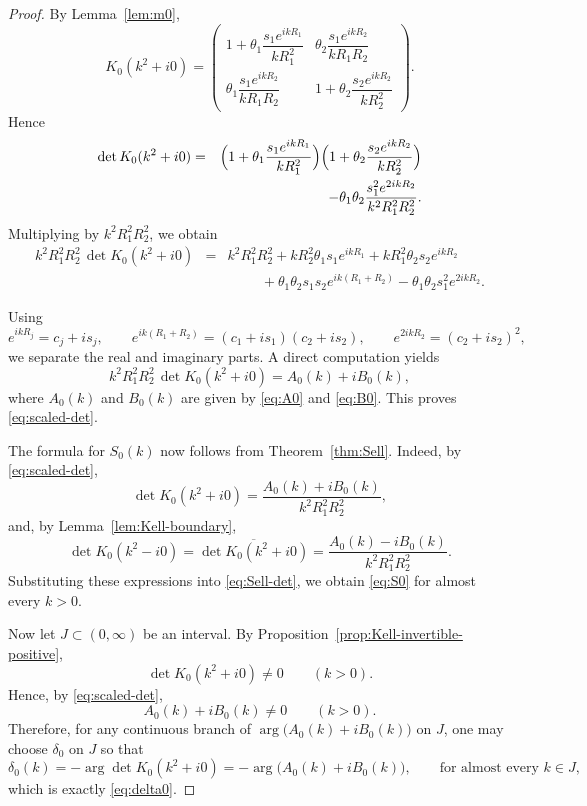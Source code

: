 \documentclass[a4paper,11pt]{article}
\numberwithin{equation}{section}
\theoremstyle{definition}
\theoremstyle{remark}
\begin{document}
\begin{proof}
By Lemma~\ref{lem:m0},
$$
K_0(k^2+i0)
=
\left(
\begin{array}{cc}
1+\theta_1\dfrac{s_1e^{ikR_1}}{kR_1^2} &
\theta_2\dfrac{s_1e^{ikR_2}}{kR_1R_2}
\\[12pt]
\theta_1\dfrac{s_1e^{ikR_2}}{kR_1R_2} &
1+\theta_2\dfrac{s_2e^{ikR_2}}{kR_2^2}
\end{array}
\right).
$$
Hence
\begin{eqnarray}
\det K_0(k^2+i0)
&=&
\Bigl(1+\theta_1\dfrac{s_1e^{ikR_1}}{kR_1^2}\Bigr)
\Bigl(1+\theta_2\dfrac{s_2e^{ikR_2}}{kR_2^2}\Bigr)
\nonumber\\
&&\hspace{1cm}
-
\theta_1\theta_2
\dfrac{s_1^2e^{2ikR_2}}{k^2R_1^2R_2^2}.
\label{eq:detK0-step1}
\end{eqnarray}
Multiplying by $k^2R_1^2R_2^2$, we obtain
\begin{eqnarray}
k^2R_1^2R_2^2\,\det K_0(k^2+i0)
&=&
k^2R_1^2R_2^2
+
kR_2^2\theta_1 s_1e^{ikR_1}
+
kR_1^2\theta_2 s_2e^{ikR_2}
\nonumber\\
&&\hspace{1cm}
+
\theta_1\theta_2 s_1s_2e^{ik(R_1+R_2)}
-
\theta_1\theta_2 s_1^2e^{2ikR_2}.
\label{eq:detK0-step2}
\end{eqnarray}

Using
$$
e^{ikR_j}=c_j+is_j,
\qquad
e^{ik(R_1+R_2)}=(c_1+is_1)(c_2+is_2),
\qquad
e^{2ikR_2}=(c_2+is_2)^2,
$$
we separate the real and imaginary parts. 
A direct computation yields
\begin{equation}\label{eq:detK0-step3}
k^2R_1^2R_2^2\,\det K_0(k^2+i0)=A_0(k)+iB_0(k),
\end{equation}
where $A_0(k)$ and $B_0(k)$ are given by \eqref{eq:A0} and \eqref{eq:B0}.
This proves \eqref{eq:scaled-det}.

The formula for $S_0(k)$ now follows from Theorem~\ref{thm:Sell}. Indeed,
by \eqref{eq:scaled-det},
$$
\det K_0(k^2+i0)=\frac{A_0(k)+iB_0(k)}{k^2R_1^2R_2^2},
$$
and, by Lemma~\ref{lem:Kell-boundary},
\[
\det K_0(k^2-i0)
=
\overline{\det K_0(k^2+i0)}
=
\frac{A_0(k)-iB_0(k)}{k^2R_1^2R_2^2}.
\]
Substituting these expressions into \eqref{eq:Sell-det}, we obtain
\eqref{eq:S0} for almost every $k>0$.

Now let $J\subset(0,\infty)$ be an interval.
By Proposition~\ref{prop:Kell-invertible-positive},
\[
\det K_0(k^2+i0)\neq0
\qquad (k>0).
\]
Hence, by \eqref{eq:scaled-det},
\[
A_0(k)+iB_0(k)\neq0
\qquad (k>0).
\]
Therefore, for any continuous branch of
$\arg\bigl(A_0(k)+iB_0(k)\bigr)$ on $J$, one may choose $\delta_0$ on $J$ so
that
\[
\delta_0(k)
=
-\arg\det K_0(k^2+i0)
=
-\arg\bigl(A_0(k)+iB_0(k)\bigr),
\qquad \text{for almost every }k\in J,
\]
which is exactly \eqref{eq:delta0}.
\end{proof}
\end{document}
